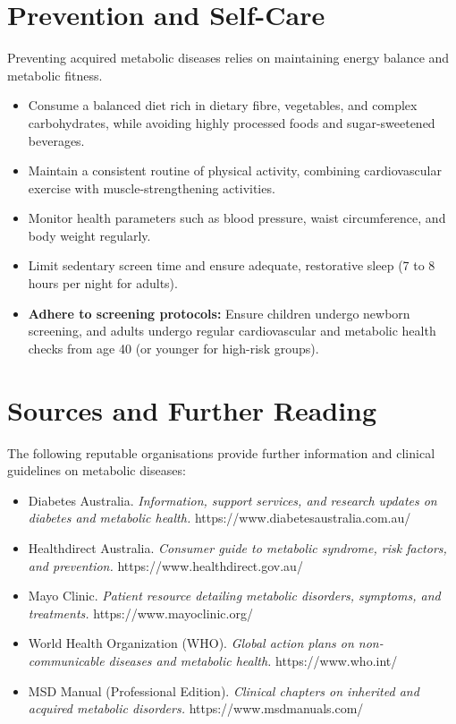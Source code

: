 \section*{Prevention and Self-Care}
Preventing acquired metabolic diseases relies on maintaining energy balance and metabolic fitness.
\begin{itemize}
    \item Consume a balanced diet rich in dietary fibre, vegetables, and complex carbohydrates, while avoiding highly processed foods and sugar-sweetened beverages.
    \item Maintain a consistent routine of physical activity, combining cardiovascular exercise with muscle-strengthening activities.
    \item Monitor health parameters such as blood pressure, waist circumference, and body weight regularly.
    \item Limit sedentary screen time and ensure adequate, restorative sleep (7 to 8 hours per night for adults).
    \item \textbf{Adhere to screening protocols:} Ensure children undergo newborn screening, and adults undergo regular cardiovascular and metabolic health checks from age 40 (or younger for high-risk groups).
\end{itemize}

\section*{Sources and Further Reading}
The following reputable organisations provide further information and clinical guidelines on metabolic diseases:
\begin{itemize}
    \item Diabetes Australia. \textit{Information, support services, and research updates on diabetes and metabolic health.} https://www.diabetesaustralia.com.au/
    \item Healthdirect Australia. \textit{Consumer guide to metabolic syndrome, risk factors, and prevention.} https://www.healthdirect.gov.au/
    \item Mayo Clinic. \textit{Patient resource detailing metabolic disorders, symptoms, and treatments.} https://www.mayoclinic.org/
    \item World Health Organization (WHO). \textit{Global action plans on non-communicable diseases and metabolic health.} https://www.who.int/
    \item MSD Manual (Professional Edition). \textit{Clinical chapters on inherited and acquired metabolic disorders.} https://www.msdmanuals.com/
\end{itemize}
